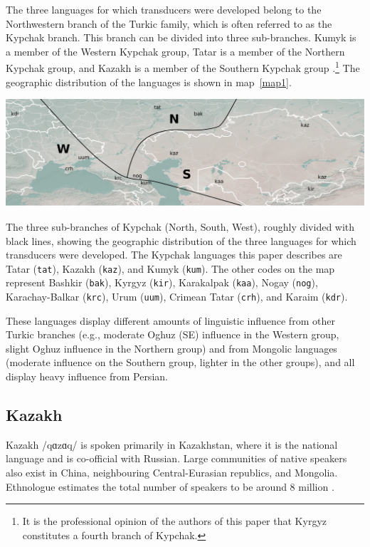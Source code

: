 \documentclass[a4paper,11pt,twocolumn]{article}
\begin{document}
The three languages for which transducers were developed belong to the Northwestern branch of the Turkic family, which is often referred to as the Kypchak branch.  This branch can be divided into three sub-branches.  Kumyk is a member of the Western Kypchak group, Tatar is a member of the Northern Kypchak group, and Kazakh is a member of the Southern Kypchak group \citep[82-83]{histofturkic}.\footnote{It is the professional opinion of the authors of this paper that Kyrgyz constitutes a fourth branch of Kypchak.}   The geographic distribution of the languages is shown in map~\ref{map1}.

\begin{map*}[htbp]
	\includegraphics[width=\textwidth]{map/map}
	\caption{The three sub-branches of Kypchak (North, South, West), roughly divided with black lines, showing the geographic distribution of the three languages for which transducers were developed.  The Kypchak languages this paper describes are Tatar (\texttt{tat}), Kazakh (\texttt{kaz}), and Kumyk (\texttt{kum}). The other codes on the map represent Bashkir (\texttt{bak}), Kyrgyz (\texttt{kir}), Karakalpak (\texttt{kaa}), Nogay (\texttt{nog}), Karachay-Balkar (\texttt{krc}), Urum (\texttt{uum}), Crimean Tatar (\texttt{crh}), and Karaim (\texttt{kdr}).}
	\label{map1}
\end{map*}

These languages display different amounts of linguistic influence from other Turkic branches (e.g., moderate Oghuz (SE) influence in the Western group, slight Oghuz influence in the Northern group) and from Mongolic languages (moderate influence on the Southern group, lighter in the other groups), and all display heavy influence from Persian.

\subsection{Kazakh}
Kazakh /q{\symbl ɑ}z{\symbl ɑ}q/ is spoken primarily in Kazakhstan, where it is the national language and is co-official with Russian.  Large communities of native speakers also exist in China, neighbouring Central-Eurasian republics, and Mongolia. Ethnologue estimates
the total number of speakers to be around 8 million \citep{ethnologue}.
\end{document}
